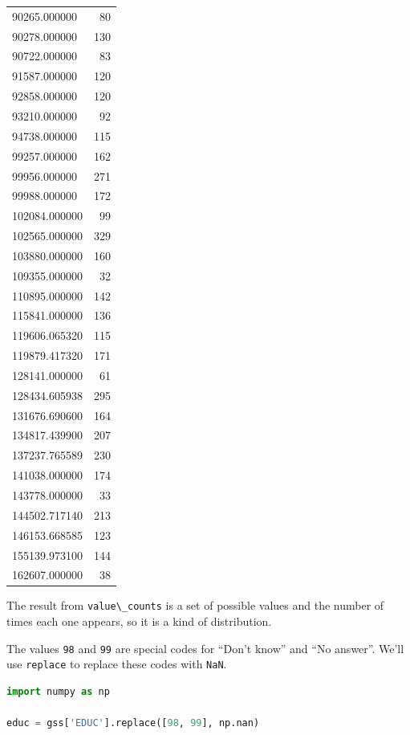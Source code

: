 \begin{tabular}{lr}
90265.000000  &    80 \\
90278.000000  &   130 \\
90722.000000  &    83 \\
91587.000000  &   120 \\
92858.000000  &   120 \\
93210.000000  &    92 \\
94738.000000  &   115 \\
99257.000000  &   162 \\
99956.000000  &   271 \\
99988.000000  &   172 \\
102084.000000 &    99 \\
102565.000000 &   329 \\
103880.000000 &   160 \\
109355.000000 &    32 \\
110895.000000 &   142 \\
115841.000000 &   136 \\
119606.065320 &   115 \\
119879.417320 &   171 \\
128141.000000 &    61 \\
128434.605938 &   295 \\
131676.690600 &   164 \\
134817.439900 &   207 \\
137237.765589 &   230 \\
141038.000000 &   174 \\
143778.000000 &    33 \\
144502.717140 &   213 \\
146153.668585 &   123 \\
155139.973100 &   144 \\
162607.000000 &    38 \\
\bottomrule
\end{tabular}

The result from \passthrough{\lstinline!value\_counts!} is a set of
possible values and the number of times each one appears, so it is a
kind of distribution.

The values \passthrough{\lstinline!98!} and \passthrough{\lstinline!99!}
are special codes for ``Don't know'' and ``No answer''. We'll use
\passthrough{\lstinline!replace!} to replace these codes with
\passthrough{\lstinline!NaN!}.

\begin{lstlisting}[language=Python,style=source]
import numpy as np

educ = gss['EDUC'].replace([98, 99], np.nan)
\end{lstlisting}

